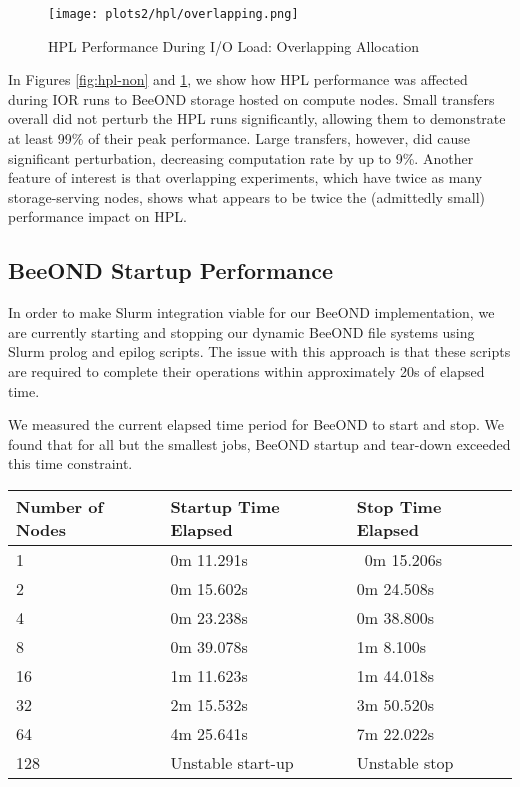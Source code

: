 \documentclass[conference]{IEEEtran}
\begin{document}
\begin{figure}[!htb]
  \centerline{\texttt{[image: plots2/hpl/overlapping.png]}}
  \caption{HPL Performance During I/O Load: Overlapping Allocation}
  \label{fig:hpl-over}
\end{figure}

In Figures \ref{fig:hpl-non} and \ref{fig:hpl-over}, we show how HPL
performance was affected during IOR runs to BeeOND storage hosted
on compute nodes. Small transfers overall did not perturb the HPL runs
significantly, allowing them to demonstrate at least 99\% of their
peak performance. Large transfers, however, did cause significant
perturbation, decreasing computation rate by up to 9\%. Another feature
of interest is that overlapping experiments, which have twice as many
storage-serving nodes, shows what appears to be twice the
(admittedly small) performance impact on HPL.

\subsection {BeeOND Startup Performance}

In order to make Slurm integration viable for our BeeOND
implementation, we are currently starting and stopping our dynamic
BeeOND file systems using Slurm prolog and epilog scripts.  The issue
with this approach is that these scripts are required to complete
their operations within approximately 20s of elapsed time.

We measured the current elapsed time period for BeeOND to start and
stop. We found that for all but the smallest jobs, BeeOND startup and
tear-down exceeded this time constraint.

\begin{center}
    \begin{tabular}{|p{2.0cm}|p{2.5cm}|p{2.5cm}|} 
    \hline\hline
Number of Nodes  & Startup Time Elapsed & Stop Time Elapsed \\
\hline
1 & 0m 11.291s & 0m 15.206s \\
\hline
2 & 0m 15.602s & 0m 24.508s \\
\hline
4 &  0m 23.238s & 0m 38.800s \\
\hline
8 & 0m 39.078s &  1m 8.100s \\
\hline
16  & 1m 11.623s & 1m 44.018s \\
\hline
32 & 2m 15.532s & 3m 50.520s \\
\hline
64 & 4m 25.641s & 7m 22.022s \\
\hline
128 & Unstable start-up & Unstable stop \\
\hline
\end{tabular}
\end{center}
\end{document}
